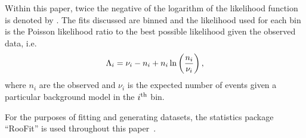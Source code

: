 Within this paper, twice the negative of the logarithm of the likelihood
function is denoted by \nll. The fits discussed are binned and the 
likelihood used for each bin is the Poisson likelihood ratio to the best
possible likelihood given the observed data, i.e.
\begin{equation}
\nll_i = \nu_i - n_i + n_i \ln\left(\frac{n_i}{\nu_i}\right),
\label{eqn:introduction:def2NLL}
\end{equation}
where $n_{i}$ are the observed and $\nu_{i}$ is the expected number of events 
given a particular background model in the $i^{\rm th}$ bin. 

For the purposes of fitting and generating datasets, the statistics package 
``RooFit'' is used throughout this paper~\cite{ref:roofit}. 

